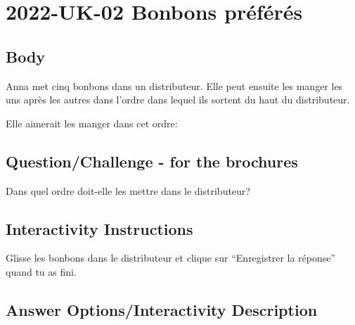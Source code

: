 \documentclass[a4paper,11pt]{report}
\newcommand{\taskGraphicsFolder}{..}
\begin{document}
\section*{\centering{} 2022-UK-02 Bonbons préférés}


\subsection*{Body}

Anna met cinq bonbons dans un distributeur. Elle peut ensuite les manger les uns après les autres dans l’ordre dans lequel ils sortent du haut du distributeur.

Elle aimerait les manger dans cet ordre:

\raisebox{-0.5ex}{} \raisebox{-0.5ex}{} \raisebox{-0.5ex}{} \raisebox{-0.5ex}{} \raisebox{-0.5ex}{}

{\em


\subsection*{Question/Challenge - for the brochures}

Dans quel ordre doit-elle les mettre dans le distributeur?

{\centering%
\par}

}


\subsection*{Interactivity Instructions}

Glisse les bonbons dans le distributeur et clique sur “Enregistrer la réponse” quand tu as fini.

\begingroup
\renewcommand{\arraystretch}{1.5}
\subsection*{Answer Options/Interactivity Description}
\end{document}

